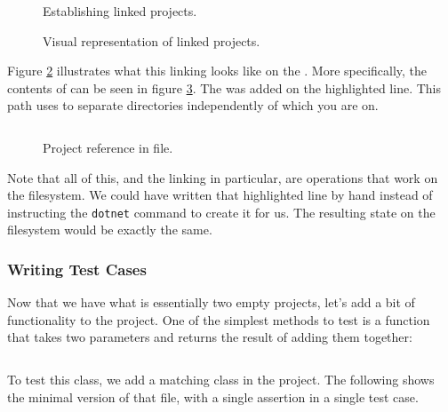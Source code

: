 \begin{figure}[tbp]
  \inputminted[linenos]{shell-session}{../src/csharp/test/linking/establish.txt}
  \caption{Establishing linked projects.}
  \label{fig:test:project:linking:establish}
\end{figure}

\begin{figure}[tbp]
  
  \caption{Visual representation of linked projects.}
  \label{fig:test:project:linking}
\end{figure}

Figure \ref{fig:test:project:linking} illustrates what this linking looks like on the . More specifically, the contents of  can be seen in figure \ref{fig:test:project:linking:reference}. The  was added on the highlighted line. This path uses  to separate directories independently of which  you are on.

\begin{figure}[tbp]
  \inputminted[highlightlines={25}, highlightcolor=yellow]{xml}{../src/csharp/test/linking/UnitTests/UnitTests.csproj}
  \caption{Project reference in  file.}
  \label{fig:test:project:linking:reference}
\end{figure}

Note that all of this, and the linking in particular, are operations that work on the filesystem. We could have written that highlighted line by hand instead of instructing the \texttt{dotnet} command to create it for us. The resulting state on the filesystem would be exactly the same.

\subsubsection{Writing Test Cases}

Now that we have what is essentially two empty projects, let's add a bit of functionality to the  project. One of the simplest methods to test is a function that takes two parameters and returns the result of adding them together:

\inputminted[]{csharp}{../src/csharp/test/linking/Codebase/Util.cs}

To test this class, we add a matching class in the  project. The following shows the minimal version of that file, with a single assertion in a single test case.

